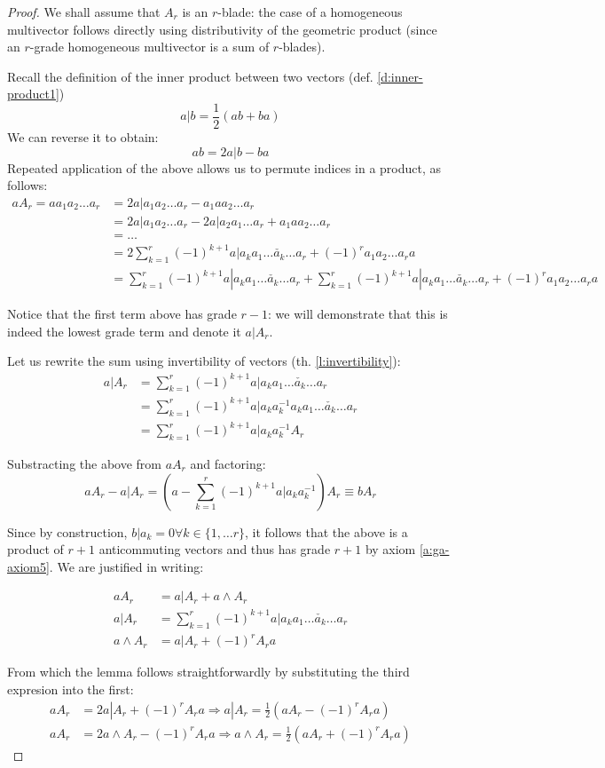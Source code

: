 \begin{proof}
	We shall assume that $A_r$ is an $r$-blade: the case of a homogeneous multivector follows directly using distributivity of the geometric product (since an $r$-grade homogeneous multivector is a sum of $r$-blades).

	Recall the definition of the inner product between two vectors (def. \ref{d:inner-product1})
	\[a | b = \frac{1}{2}(ab + ba)\]
	We can reverse it to obtain:
	\[ab = 2 a | b - ba\]
	Repeated application of the above allows us to permute indices in a product, as follows:
	\begin{align*}
		aA_r = aa_1a_2 \ldots a_r &= 2a|a_1a_2 \ldots a_r - a_1aa_2 \ldots a_r \\
		&= 2a|a_1a_2 \ldots a_r - 2a|a_2a_1 \ldots a_r + a_1aa_2 \ldots a_r \\
		&= \ldots \\
		&= 2 \sum_{k=1}^r (-1)^{k+1}a|a_k a_1 \ldots \check{a_k} \ldots a_r + (-1)^ra_1a_2 \ldots a_ra \\
		&= \sum_{k=1}^r (-1)^{k+1}a|a_k a_1 \ldots \check{a_k} \ldots a_r + \sum_{k=1}^r (-1)^{k+1}a|a_k a_1 \ldots \check{a_k} \ldots a_r + (-1)^ra_1a_2 \ldots a_ra
	\end{align*}

	Notice that the first term above has grade $r-1$: we will demonstrate that this is indeed the lowest grade term and denote it $a | A_r$.
	
	Let us rewrite the sum using invertibility of vectors (th. \ref{l:invertibility}):
	\begin{align*}
		a | A_r &= \sum_{k=1}^r (-1)^{k+1}a|a_k a_1 \ldots \check{a_k} \ldots a_r\\
				&= \sum_{k=1}^r (-1)^{k+1}a|a_k a_k^{-1}a_k a_1 \ldots \check{a_k} \ldots a_r\\
				&= \sum_{k=1}^r (-1)^{k+1}a|a_k a_k^{-1} A_r 
	\end{align*}

	Substracting the above from $aA_r$ and factoring:
	\[aA_r - a | A_r = (a - \sum_{k=1}^r (-1)^{k+1}a|a_k a_k^{-1})A_r \equiv bA_r\]
	
	Since by construction, $b | a_k = 0 \forall k \in \{1, \ldots r\}$, it follows that the above is a product of $r+1$ anticommuting vectors and thus has grade $r+1$ by axiom \ref{a:ga-axiom5}. We are justified in writing:

	\begin{align*}
		aA_r &= a | A_r + a \wedge A_r \\
		a | A_r &= \sum_{k=1}^r (-1)^{k+1}a|a_k a_1 \ldots \check{a_k} \ldots a_r \\
		a \wedge A_r &= a | A_r + (-1)^rA_ra
	\end{align*}

	From which the lemma follows straightforwardly by substituting the third expresion into the first:
	\begin{align*}
		aA_r &= 2a | A_r + (-1)^rA_ra \Rightarrow a | A_r = \frac{1}{2} (aA_r - (-1)^rA_ra) \\
		aA_r &= 2a \wedge A_r - (-1)^rA_ra \Rightarrow a \wedge A_r = \frac{1}{2} (aA_r + (-1)^rA_ra)
	\end{align*}
\end{proof}
